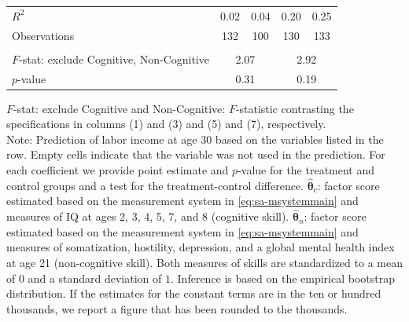 \documentclass[static]{JJH-Beamer}
\begin{document}
\begin{frame}
\begin{table}[H]
\begin{center}
{\begin{tabular}{lcccccccc}
$R^2$ &         \multicolumn{2}{c}{0.02} &          \multicolumn{2}{c}{0.04} &             \multicolumn{2}{c}{0.20} &                 \multicolumn{2}{c}{0.25}  \\
Observations &        \multicolumn{2}{c}{132} &        \multicolumn{2}{c}{100} &     \multicolumn{2}{c}{130} &         \multicolumn{2}{c}{133}  \\  \\ \midrule
$F$-stat: exclude Cognitive, Non-Cognitive  &             \multicolumn{4}{c}{2.07} &               \multicolumn{4}{c}{2.92}  \\
$p$-value &                \multicolumn{4}{c}{0.31} &               \multicolumn{4}{c}{0.19}   \\
\bottomrule
\end{tabular}
}
\end{center}
\tiny \flushleft
$F$-stat: exclude Cognitive and Non-Cognitive: $F$-statistic contrasting the specifications in columns (1) and (3) and (5) and (7), respectively.\\
Note: Prediction of labor income at age 30 based on the variables listed in the row. Empty cells indicate that the variable was not used in the prediction. For each coefficient we provide point estimate and $p$-value for the treatment and control groups and a test for the treatment-control difference. $\hat{\bm{\theta}}_{c}$: factor score estimated based on the measurement system in \eqref{eq:sa-msystemmain} and measures of IQ at ages 2, 3, 4, 5, 7, and 8 (cognitive skill). $\hat{\bm{\theta}}_{n}$: factor score estimated based on the measurement system in \eqref{eq:sa-msystemmain} and measures of somatization, hostility, depression, and a global mental health index at age 21 (non-cognitive skill). Both measures of skills are standardized to a mean of $0$ and a standard deviation of $1$. Inference is based on the empirical bootstrap distribution. If the estimates for the constant terms are in the ten or hundred thousands, we report a figure that has been rounded to the thousands.\\
\end{table}

\end{frame}
\end{document}
